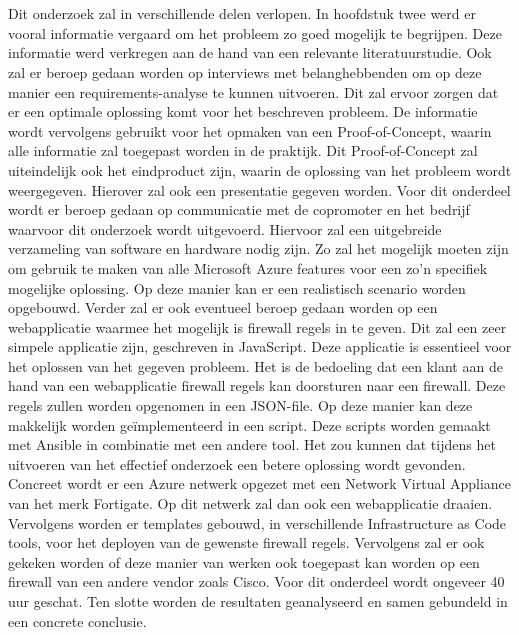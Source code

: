 \chapter{}%
\label{ch:methodologie}
Dit onderzoek zal in verschillende delen verlopen. In hoofdstuk twee werd er vooral informatie vergaard om het probleem zo goed mogelijk te begrijpen. Deze informatie werd verkregen aan de hand van een relevante literatuurstudie. Ook zal er beroep gedaan worden op interviews met belanghebbenden om op deze manier een requirements-analyse te kunnen uitvoeren. Dit zal ervoor zorgen dat er een optimale oplossing komt voor het beschreven probleem. De informatie wordt vervolgens gebruikt voor het opmaken van een Proof-of-Concept, waarin alle informatie zal toegepast worden in de praktijk. Dit Proof-of-Concept zal uiteindelijk ook het eindproduct zijn, waarin de oplossing van het probleem wordt weergegeven. Hierover zal ook een presentatie gegeven worden. Voor dit onderdeel wordt er beroep gedaan op communicatie met de copromoter en het bedrijf waarvoor dit onderzoek wordt uitgevoerd. Hiervoor zal een uitgebreide verzameling van software en hardware nodig zijn. Zo zal het mogelijk moeten zijn om gebruik te maken van alle Microsoft Azure features voor een zo'n specifiek mogelijke oplossing. Op deze manier kan er een realistisch scenario worden opgebouwd. Verder zal er ook eventueel beroep gedaan worden op een webapplicatie waarmee het mogelijk is firewall regels in te geven. Dit zal een zeer simpele applicatie zijn, geschreven in JavaScript. Deze applicatie is essentieel voor het oplossen van het gegeven probleem. Het is de bedoeling dat een klant aan de hand van een webapplicatie firewall regels kan doorsturen naar een firewall. Deze regels zullen worden opgenomen in een JSON-file. Op deze manier kan deze makkelijk worden geïmplementeerd in een script. Deze scripts worden gemaakt met Ansible in combinatie met een andere tool.  
Het zou kunnen dat tijdens het uitvoeren van het effectief onderzoek een betere oplossing wordt gevonden.
Concreet wordt er een Azure netwerk opgezet met een Network Virtual Appliance van het merk Fortigate. Op dit netwerk zal dan ook een webapplicatie draaien. Vervolgens worden er templates gebouwd, in verschillende Infrastructure as Code tools, voor het deployen van de gewenste firewall regels. Vervolgens zal er ook gekeken worden of deze manier van werken ook toegepast kan worden op een firewall van een andere vendor zoals Cisco. Voor dit onderdeel wordt ongeveer 40 uur geschat. Ten slotte worden de resultaten geanalyseerd en samen gebundeld in een concrete conclusie. 



